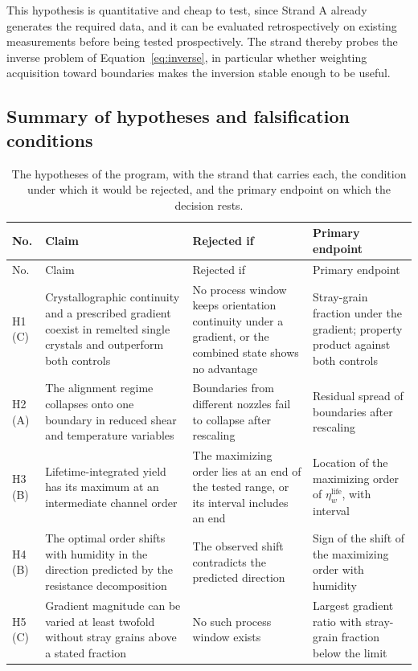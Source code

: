 \documentclass[11pt]{article}
\theoremstyle{definition}
\begin{document}
This hypothesis is quantitative and cheap to test, since Strand A already generates the required data, and it can be evaluated retrospectively on existing measurements before being tested prospectively. The strand thereby probes the inverse problem of Equation~\eqref{eq:inverse}, in particular whether weighting acquisition toward boundaries makes the inversion stable enough to be useful.


\subsection{Summary of hypotheses and falsification conditions}

\begin{small}
\setlength{\tabcolsep}{3pt}
\begin{longtable}{@{}p{1.2cm}p{4.1cm}p{4.3cm}p{3.7cm}@{}}
\caption{The hypotheses of the program, with the strand that carries each, the condition under which it would be rejected, and the primary endpoint on which the decision rests.}\label{tab:hyp}\\
\toprule
No. & Claim & Rejected if & Primary endpoint \\
\midrule
\endfirsthead
\toprule
No. & Claim & Rejected if & Primary endpoint \\
\midrule
\endhead
\bottomrule
\endfoot
H1 (C) & Crystallographic continuity and a prescribed gradient coexist in remelted single crystals and outperform both controls & No process window keeps orientation continuity under a gradient, or the combined state shows no advantage & Stray-grain fraction under the gradient; property product against both controls \\
H2 (A) & The alignment regime collapses onto one boundary in reduced shear and temperature variables & Boundaries from different nozzles fail to collapse after rescaling & Residual spread of boundaries after rescaling \\
H3 (B) & Lifetime-integrated yield has its maximum at an intermediate channel order & The maximizing order lies at an end of the tested range, or its interval includes an end & Location of the maximizing order of $\eta_w^{\mathrm{life}}$, with interval \\
H4 (B) & The optimal order shifts with humidity in the direction predicted by the resistance decomposition & The observed shift contradicts the predicted direction & Sign of the shift of the maximizing order with humidity \\
H5 (C) & Gradient magnitude can be varied at least twofold without stray grains above a stated fraction & No such process window exists & Largest gradient ratio with stray-grain fraction below the limit \\

\end{longtable}
\end{small}
\end{document}
